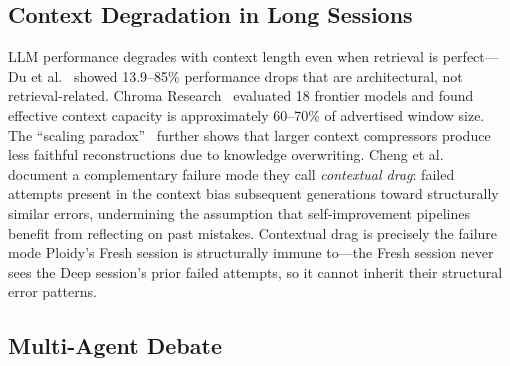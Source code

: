 \documentclass[11pt]{article}
\begin{document}
\subsection{Context Degradation in Long Sessions}
\label{sec:context-degradation}

LLM performance degrades with context length even when retrieval is perfect---Du et al.~\citep{du2025context} showed 13.9--85\% performance drops that are architectural, not retrieval-related. Chroma Research~\citep{chroma2025contextrot} evaluated 18 frontier models and found effective context capacity is approximately 60--70\% of advertised window size. The ``scaling paradox''~\citep{scaling2026paradox} further shows that larger context compressors produce less faithful reconstructions due to knowledge overwriting. Cheng et al.~\citep{cheng2026contextualdrag} document a complementary failure mode they call \emph{contextual drag}: failed attempts present in the context bias subsequent generations toward structurally similar errors, undermining the assumption that self-improvement pipelines benefit from reflecting on past mistakes. Contextual drag is precisely the failure mode Ploidy's Fresh session is structurally immune to---the Fresh session never sees the Deep session's prior failed attempts, so it cannot inherit their structural error patterns.

\subsection{Multi-Agent Debate}
\label{sec:mad}
\end{document}
